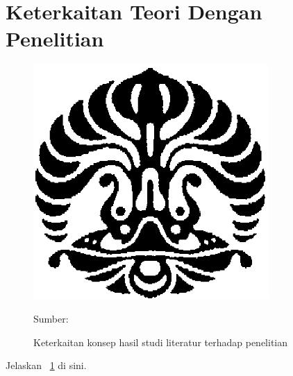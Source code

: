 \section{Keterkaitan Teori Dengan Penelitian}
\begin{figure}
	\centering
	\caption{Keterkaitan konsep hasil studi literatur terhadap penelitian}
	\includegraphics[width=0.8\textwidth]{assets/pics/makara.png}\\
	\label{fig:research_concept_map}
	{\footnotesize Sumber: \textcite{Sugiyono2008}\par}
\end{figure}

Jelaskan \pic~\ref{fig:research_concept_map} di sini.
